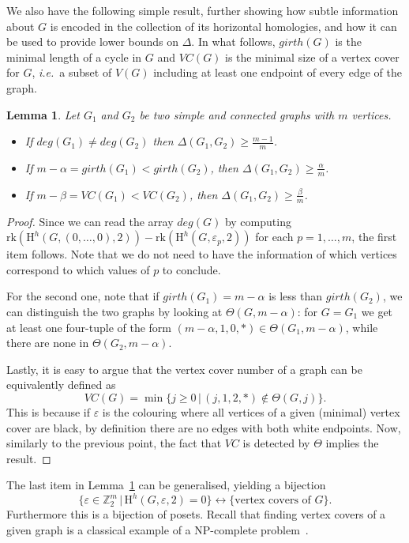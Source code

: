\documentclass[11pt, a4paper, reqno, twoside, makeidx]{amsart}
\theoremstyle{remark}
\theoremstyle{plain}
\newtheorem{lem}[thm]{Lemma}
\theoremstyle{definition}
\newcommand{\Z}{\mathbb{Z}}
\newcommand{\HH}{\mathrm{H}}
\begin{document}
We also have the following simple result, further showing how subtle information about $G$ is encoded in the collection of its horizontal homologies, and how it can be used to provide lower bounds on $\Delta$. In what follows, $girth(G)$ is the minimal length of a cycle in $G$ and $VC(G)$ is the minimal size of a vertex cover for $G$, \emph{i.e.}~a subset of $V(G)$ including at least one endpoint of every edge of the graph.
\begin{lem}\label{lem:boundsondelta}
Let $G_1$ and $G_2$ be two simple and connected graphs with $m$ vertices.
\begin{itemize}
\item If $deg(G_1) \neq deg(G_2)$ then $\Delta(G_1,G_2) \ge \frac{m-1}{m}$.
\item If  $m- \alpha = girth (G_1) < girth(G_2)$, then $\Delta(G_1,G_2) \ge \frac{\alpha}{m}$.
\item If  $m- \beta = VC (G_1) < VC(G_2)$, then $\Delta(G_1,G_2) \ge \frac{\beta}{m}$.
\end{itemize}
\end{lem}
\begin{proof}
Since we can read the array $deg(G)$ by computing $\mathrm{rk}( \HH^h(G, (0, \ldots, 0), 2)) - \mathrm{rk} (\HH^h(G, \varepsilon_p,2))$ for each $p = 1, \ldots, m$, the first item follows. Note that we do not need to have the information of which vertices correspond to which values of $p$ to conclude.

For the second one, note that if $girth(G_1) = m-\alpha$ is less than $girth(G_2)$, we can distinguish the two graphs by looking at $\Theta(G,m-\alpha)$: for $G= G_1$ we get at least one four-tuple of the form $(m-\alpha, 1,0,*) \in \Theta(G_1,m-\alpha)$, while there are none in $\Theta(G_2,m-\alpha)$. 

Lastly, it is easy to argue that the vertex cover number of a graph can be equivalently defined as $$VC(G) = \min \{j\ge 0\,|\, (j, 1, 2,*) \notin \Theta(G,j)\}.$$ 
This is because if $\varepsilon$ is the colouring where all vertices of a given (minimal) vertex cover are black, by definition there are no edges with both white endpoints.
Now, similarly to the previous point,  the fact that $VC$ is detected by  $\Theta$ implies the result.
\end{proof}
The last item in Lemma~\ref{lem:boundsondelta} can be generalised, yielding a bijection 
\begin{equation*}
\{\varepsilon \in \Z_2^m \,|\, \HH^h(G, \varepsilon,2) = 0\} \longleftrightarrow \{\text{vertex covers of } G\}.
\end{equation*}
Furthermore this is a bijection of posets. Recall that finding vertex covers of a given graph is a classical example of a NP-complete problem~\cite{karp1972reducibility}.\\
\end{document}
